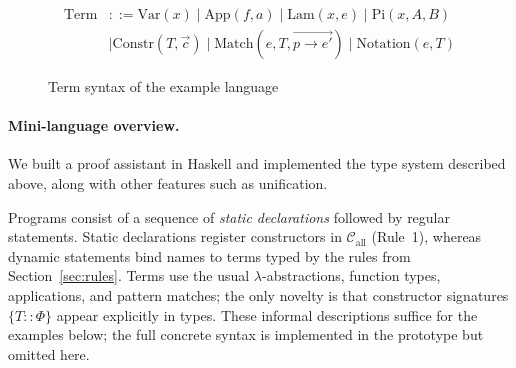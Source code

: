 \documentclass[a4paper, anonymous, UKenglish,cleveref, autoref, thm-restate]{lipics-v2021}
\begin{document}
\begin{figure}[!ht]
\begin{align*}
\text{Term} &::= \text{Var}(x) \mid \text{App}(f, a) \mid \text{Lam}(x, e) \mid \text{Pi}(x, A, B) \\
&\mid \text{Constr}(T, \overrightarrow{c}) \mid \text{Match}(e, T, \overrightarrow{p \to e'}) \mid \text{Notation}(e, T)
\end{align*}
	
\caption{Term syntax of the example language}
\label{fig:term-syntax}
\end{figure}

\paragraph{Mini-language overview.}
We built a proof assistant in Haskell and implemented the type system described above, along with other features such as unification.

Programs consist of a sequence of \emph{static declarations} followed by regular statements. Static declarations register constructors in $\mathcal{C}_{\text{all}}$ (Rule~1), whereas dynamic statements bind names to terms typed by the rules from Section~\ref{sec:rules}. Terms use the usual $\lambda$-abstractions, function types, applications, and pattern matches; the only novelty is that constructor signatures $\{T :: \Phi\}$ appear explicitly in types. These informal descriptions suffice for the examples below; the full concrete syntax is implemented in the prototype but omitted here.
\end{document}
